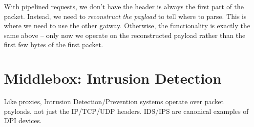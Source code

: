 With pipelined requests, we don't have the header is always the first part of the packet. Instead, we need to {\it reconstruct the payload} to tell where to parse. This is where we need to use the other gatway. Otherwise, the functionality is exactly the same above -- only now we operate on the reconstructed payload rather than the first few bytes of the first packet.


\section{Middlebox: Intrusion Detection}
Like proxies, Intrusion Detection/Prevention systems operate over packet payloads, not just the IP/TCP/UDP headers.
IDS/IPS are canonical examples of DPI devices.


